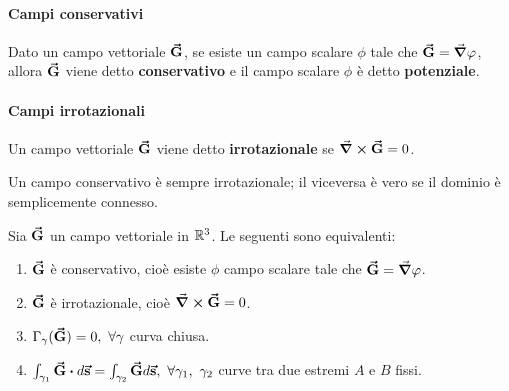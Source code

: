 \paragraph{Campi conservativi}
\begin{define}
	Dato un campo vettoriale $\vb*{\va{G}}$, se esiste un campo scalare $\phi$ tale che $\vb*{\va{G}}=\grad{\varphi}$, allora $\vb*{\va{G}}$ viene detto \textbf{conservativo} e il campo scalare $\phi$ è detto \textbf{potenziale}.
\end{define}
\paragraph{Campi irrotazionali}
\begin{define}
	Un campo vettoriale $\vb*{\va{G}}$ viene detto \textbf{irrotazionale} se $\curl{\vb*{\va{G}}}=0$.
\end{define}
\begin{propositionqed}
	Un campo conservativo è sempre irrotazionale; il viceversa è vero se il dominio è semplicemente connesso.
\end{propositionqed}
\begin{theoremaqed}
	Sia $\vb*{\va{G}}$ un campo vettoriale in $\mathbb{R}^3$. Le seguenti sono equivalenti:
	\begin{enumerate}[label=\roman*)]
		\item $\vb*{\va{G}}$ è conservativo, cioè esiste $\phi$ campo scalare tale che $\vb*{\va{G}}=\grad{\varphi}$.
		\item $\vb*{\va{G}}$ è irrotazionale, cioè $\curl{\vb*{\va{G}}}=0$.
		\item $\Gamma_{\gamma}(\vb*{\va{G}})=0,\ \forall \gamma$ curva chiusa.
		\item $\int_{\gamma_1}\vba{G}\vdot d\vba{s}=\int_{\gamma_2}\vba{G}d\vba{s},\ \forall \gamma_1,\ \gamma_2$ curve tra due estremi $A$ e $B$ fissi.
	\end{enumerate}
\end{theoremaqed}
